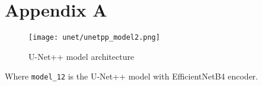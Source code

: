 \section{Appendix A}\label{sec:appendixA}

\begin{figure}[H]
  \begin{center}
    \texttt{[image: unet/unetpp\_model2.png]}
  \end{center}
  \caption{U-Net++ model architecture}\label{fig:unetpp_model}
\end{figure}

Where \texttt{model\_12} is the U-Net++ model with EfficientNetB4 encoder.
